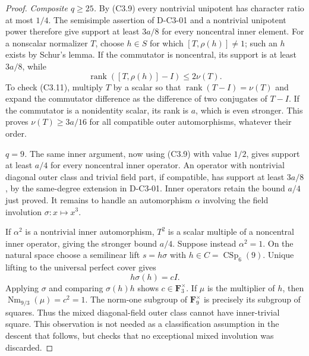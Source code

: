 \begin{proof}
\emph{Composite $q\ge25$.}
By (C3.9) every nontrivial unipotent has character ratio at most
$1/4$. The semisimple assertion of D-C3-01 and a nontrivial
unipotent power therefore give support at least $3a/8$ for every
noncentral inner element. For a nonscalar normalizer $T$, choose
$h\in S$ for which $[T,\rho(h)]\ne1$; such an $h$ exists by
Schur's lemma. If the commutator is noncentral, its support is
at least $3a/8$, while
\[
 \operatorname{rank}([T,\rho(h)]-I)\le2\nu(T).
                                                               \tag{C3.11}
\]
To check (C3.11), multiply $T$ by a scalar so that
$\operatorname{rank}(T-I)=\nu(T)$ and expand the commutator
difference as the difference of two conjugates of $T-I$.
If the commutator is a nonidentity scalar, its rank is $a$,
which is even stronger. This proves $\nu(T)\ge3a/16$ for
all compatible outer automorphisms, whatever their order.

\emph{$q=9$.}
The same inner argument, now using (C3.9) with value $1/2$,
gives support at least $a/4$ for every noncentral inner operator.
An operator with nontrivial diagonal outer class and trivial field
part, if compatible,
has support at least $3a/8$, by the same-degree extension in
D-C3-01. Inner operators retain the bound $a/4$ just proved.
It remains to handle an automorphism $\alpha$ involving the
field involution $\sigma:x\mapsto x^3$.

If $\alpha^2$ is a nontrivial inner automorphism, $T^2$ is a
scalar multiple of a noncentral inner operator, giving the
stronger bound $a/4$. Suppose instead $\alpha^2=1$. On the
natural space choose a semilinear lift $s=h\sigma$ with
$h\in C=\operatorname{CSp}_6(9)$. Unique lifting to the
universal perfect cover gives
\[
 h\sigma(h)=cI.
                                                               \tag{C3.12}
\]
Applying $\sigma$ and comparing $\sigma(h)h$ shows
$c\in\mathbf F_3^\times$. If $\mu$ is the multiplier of $h$,
then $\operatorname{Nm}_{9/3}(\mu)=c^2=1$.
The norm-one subgroup of $\mathbf F_9^\times$ is precisely
its subgroup of squares. Thus the mixed diagonal-field outer
class cannot have inner-trivial square. This observation is
not needed as a classification assumption in the descent that
follows, but checks that no exceptional mixed involution was
discarded.


\end{proof}
